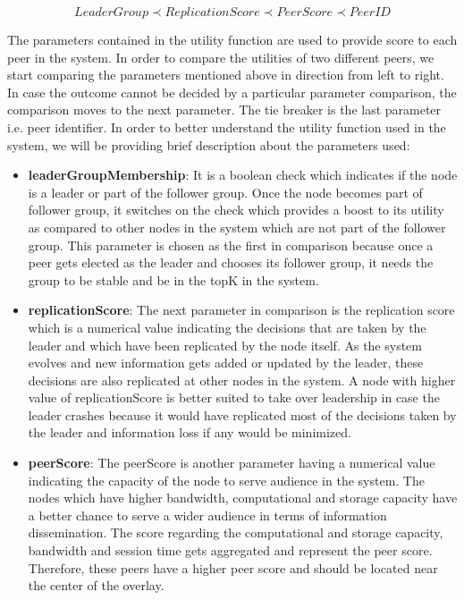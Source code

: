 \documentclass[a4paper,11pt]{kth-mag}
\begin{document}
\small
\begin{equation*}
    LeaderGroup \prec ReplicationScore \prec PeerScore \prec PeerID
\end{equation*}
\normalsize

The parameters contained in the utility function are used to provide score to each peer in the system. In order to compare the utilities of two different peers, we start comparing the parameters mentioned above in direction from left to right. In case the outcome cannot be decided by a particular parameter comparison, the comparison moves to the next parameter. The tie breaker is the last parameter i.e. peer identifier. In order to better understand the utility function used in the system, we will be providing brief description about the parameters used:

\begin{itemize}


\item \textbf{leaderGroupMembership}: It is a boolean check which indicates if the node is a leader or part of the follower group. Once the node becomes part of follower group, it switches on the check which provides a boost to its utility as compared to other nodes in the system which are not part of the follower group. This parameter is chosen as the first in comparison because once a peer gets elected as the leader and chooses its follower group, it needs the group to be stable and be in the topK in the system.


\item \textbf{replicationScore}: The next parameter in comparison is the replication score which is a numerical value indicating the decisions that are taken by the leader and which have been replicated by the node itself. As the system evolves and new information gets added or updated by the leader, these decisions are also replicated at other nodes in the system. A node with higher value of replicationScore is better suited to take  over leadership in case the leader crashes because it would have replicated most of the decisions taken by the leader and information loss if any would be minimized.

\item \textbf{peerScore}: The peerScore is another parameter having a numerical value indicating the capacity of the node to serve audience in the system. The nodes which have higher bandwidth, computational and storage capacity have a better chance to serve a wider audience in terms of information dissemination. The score regarding the computational and storage capacity, bandwidth and session time gets aggregated and represent the peer score. Therefore, these peers have a higher peer score and should be located near the center of the overlay.



\end{itemize}
\end{document}
